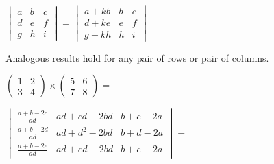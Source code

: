 \documentclass[11pt]{scrartcl}
\begin{document}
\begin{proposition}\label{addcolumn}\
  \begin{center}
    $\begin{vmatrix} a & b & c \\ d & e & f \\ g & h & i \end{vmatrix} =
    \begin{vmatrix} a+kb & b & c \\ d+ke & e & f \\ g+kh & h & i \end{vmatrix} $\
  \end{center}
    Analogous results hold for any pair of rows or pair of columns. 
\end{proposition}
\begin{exercise}
  $\begin{pmatrix} 1 & 2 \\ 3 & 4 \end{pmatrix}
  \times
  \begin{pmatrix} 5 & 6 \\ 7 & 8 \end{pmatrix} =$
\end{exercise}
\begin{exercise}
  $\begin{vmatrix} \frac{a+b-2c}{ad} & ad+cd-2bd & b+c-2a \\ \frac{a+b-2d}{ad} & ad+d^2-2bd & b+d-2a \\ \frac{a+b-2e}{ad} & ad+ed-2bd & b+e-2a \end{vmatrix}=$
\end{exercise}
\end{document}
